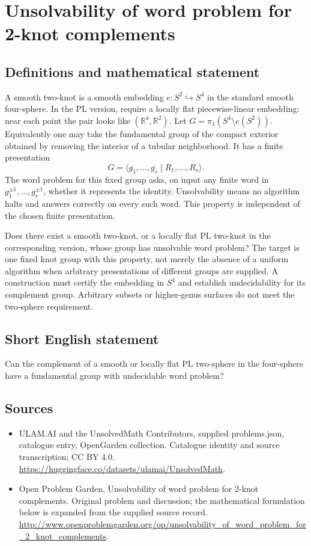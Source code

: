 \documentclass[11pt,a4paper]{article}
\begin{document}
\section*{Unsolvability of word problem for 2-knot complements}\label{statement}

\subsection{Definitions and mathematical statement}
A smooth two-knot is a smooth embedding $e:S^2\hookrightarrow S^4$
in the standard smooth four-sphere. In the PL version, require a
locally flat piecewise-linear embedding: near each point the pair
looks like $(\mathbb R^4,\mathbb R^2)$. Let
$G=\pi_1(S^4\setminus e(S^2))$. Equivalently one may take the
fundamental group of the compact exterior obtained by removing
the interior of a tubular neighborhood. It has a finite presentation
\[
                   G=\langle g_1,\ldots,g_r\mid R_1,\ldots,R_s\rangle.
\]
The word problem for this fixed group asks, on input any finite
word in $g_1^{\pm1},\ldots,g_r^{\pm1}$, whether it represents the
identity. Unsolvability means no algorithm halts and answers correctly
on every such word. This property is independent of the chosen
finite presentation.

Does there exist a smooth two-knot, or a locally flat PL two-knot
in the corresponding version, whose group has unsolvable word
problem? The target is one fixed knot group with this property,
not merely the absence of a uniform algorithm when arbitrary
presentations of different groups are supplied. A construction must
certify the embedding in $S^4$ and establish undecidability for
its complement group. Arbitrary subsets or higher-genus surfaces
do not meet the two-sphere requirement.
\subsection{Short English statement}
Can the complement of a smooth or locally flat PL two-sphere in the four-sphere have a fundamental group with undecidable word problem?
\subsection{Sources}
\begin{itemize}
\item[S1] ULAM.AI and the UnsolvedMath Contributors, supplied problems.json, catalogue entry, OpenGarden collection. Catalogue identity and source transcription; CC BY 4.0.
\url{https://huggingface.co/datasets/ulamai/UnsolvedMath}.
\item[S2] Open Problem Garden, Unsolvability of word problem for 2-knot complements. Original problem and discussion; the mathematical formulation below is expanded from the supplied source record.
\url{http://www.openproblemgarden.org/op/unsolvability_of_word_problem_for_2_knot_complements}.
\end{itemize}
\end{document}
